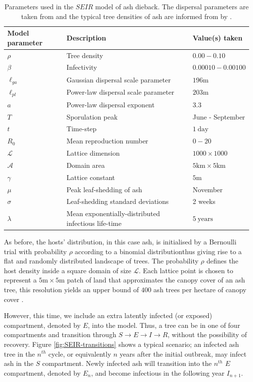 \begin{table}[h]
\centering
\begin{tabular}{l l l}
\hline
\textbf{Model parameter} & \textbf{Description} & \textbf{Value(s) taken}\\
\hline
$\rho$  & Tree density & $0.00 - 0.10$ \\ 
$\beta$ & Infectivity & $0.00010 - 0.00100$ \\
$\ell_{ga}$ & Gaussian dispersal scale parameter& $196\mathrm{m}$ \\
$\ell_{pl}$ & Power-law dispersal scale parameter& $203\mathrm{m}$ \\
$a$ & Power-law dispersal exponent & $3.3$ \\
$T$ & Sporulation peak & June - September \\
$t$ & Time-step & $1\ \mathrm{day}$\\
$R_0$ & Mean reproduction number & $0-20$ \\
$\mathcal{L}$ & Lattice dimension & $1000\times1000$ \\
$\mathcal{A}$ & Domain area & $5\mathrm{km}\times5\mathrm{km}$ \\
$\gamma$ & Lattice constant & $5\mathrm{m}$ \\
$\mu$ & Peak leaf-shedding of ash & November \\
$\sigma$ & Leaf-shedding standard deviations & 2 weeks \\
$\lambda$ & Mean exponentially-distributed infectious life-time  & $5\ \mathrm{years}$ \\
\hline
\end{tabular}
\caption{Parameters used in the $SEIR$ model of ash dieback. The dispersal parameters are taken from \cite{grosdidier2018tracking} and the typical tree densities of ash are informed from by \cite{hill.data}.}
\label{tab:SEIR-model}
\end{table}

As before, the hosts' distribution, in this case ash, is initialised by a Bernoulli trial with probability $\rho$ according to a binomial distribution\textemdash thus giving rise to a flat and randomly distributed landscape of trees. The probability $\rho$ defines the host density inside a square domain of size $\mathcal{L}$. Each lattice point is chosen to represent a $5\mathrm{m}\times5\mathrm{m}$ patch of land that approximates the canopy cover of an ash tree, this resolution yields an upper bound of $400$ ash trees per hectare of canopy cover \cite{ash-tree2, ash-tree1}.

However, this time, we include an extra latently infected (or exposed) compartment, denoted by $E$, into the model. Thus, a tree can be in one of four compartments and transition through $S\rightarrow E \rightarrow I \rightarrow R$, without the possibility of recovery. Figure \ref{fig:SEIR-transitions} shows a typical scenario; an infected ash tree in the $n^{th}$ cycle, or equivalently $n$ years after the initial outbreak, may infect ash in the $S$ compartment. Newly infected ash will transition into the $n^{th}$ $E$ compartment, denoted by $E_n$, and become infectious in the following year $I_{n+1}$. 

